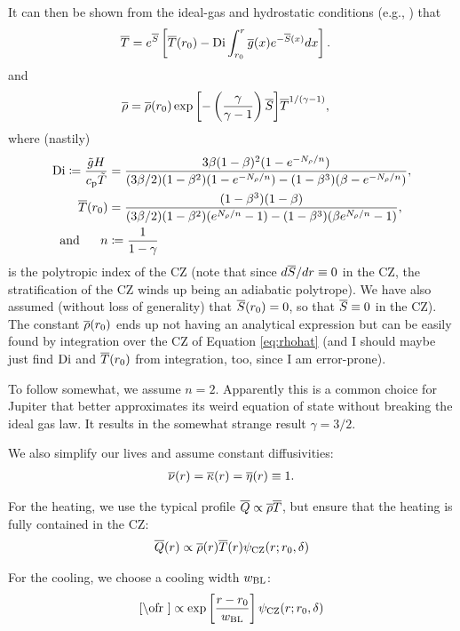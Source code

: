 \documentclass[12pt]{article}
\numberwithin{equation}{section}
\newcommand{\cz}{_{\rm{CZ}}}
\begin{document}
It can then be shown from the ideal-gas and hydrostatic conditions (e.g., \citealt{Matilsky2023d}) that
\begin{align}\label{eq:tmphat}
	\overline{T} &= e^{\overline{S}}\left[\overline{T}(r_0) - {\rm{Di}}\int_{r_0}^r \overline{g}(x)  e^{-\overline{S}(x)}dx\right].
\end{align}
and
\begin{align}\label{eq:rhohat}
	\overline{\rho} &= \overline{\rho}(r_0) \exp{\left[-\left(\frac{\gamma}{\gamma-1}\right)\overline{S}\right]}\overline{T}^{1/(\gamma-1)},
\end{align}
where (nastily)
\begin{align}\label{eq:digory}
	{\rm{Di}} \coloneqq \frac{\tilde{g}H}{c_{\rm{p}}\tilde{T}} &=  \frac{3 \beta (1 - \beta)^2 (1 - e^{-N_\rho/n})} 
	{ (3\beta/2) (1 - \beta^2) (1 - e^{-N_\rho/n}) - (1-\beta^3)(\beta-e^{-N_\rho/n})},\\
	\overline{T}(r_0)&= \frac{(1-\beta^3)(1-\beta)}{(3\beta/2)(1-\beta^2)(e^{N_\rho/n}-1) - (1-\beta^3)(\beta e^{N_\rho/n}-1)},\\
	\text{and}\ \ \ \ \  n &\coloneqq \frac{1}{1-\gamma}
\end{align}
is the polytropic index of the CZ (note that since $d\overline{S}/dr\equiv0$ in the CZ, the stratification of the CZ winds up being an adiabatic polytrope). We have also assumed (without loss of generality) that $\overline{S}(r_0)=0$, so that $\overline{S}\equiv0$ in the CZ). The constant $\overline{\rho}(r_0)$ ends up not having an analytical expression but can be easily found by integration over the CZ of Equation \eqref{eq:rhohat} (and I should maybe just find ${\rm{Di}}$ and $\overline{T}(r_0)$ from integration, too, since I am error-prone).  

To follow \citet{Jones2011} \citet{Heimpel2022} somewhat, we assume $n=2$. Apparently this is a common choice for Jupiter that better approximates its weird equation of state without breaking the ideal gas law. It results in the somewhat strange result $\gamma=3/2$. 

We also simplify our lives and assume constant diffusivities:
\begin{align}
	\overline{\nu}(r)=\overline{\kappa}(r)=\overline{\eta}(r)\equiv 1.
\end{align}

For the heating, we use the typical {\rayleigh} profile $\overline{Q}\propto \overline{\rho} \overline{T}$, but ensure that the heating is fully contained in the CZ:
\begin{align}
	\qref\ofr \propto \rhoref\ofr\tmpref\ofr \psi\cz(r; r_0,\delta)
\end{align} 

For the cooling, we choose a cooling width $w_{\rm BL}$:
\begin{align}
	\cref\ofr \propto \exp\left[\frac{r-r_0}{w_{\rm BL}}\right] \psi\cz(r; r_0,\delta)
\end{align}
\end{document}
